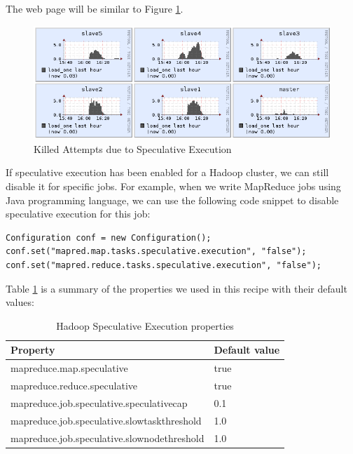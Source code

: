 The web page will be similar to Figure \ref{fig:killed.jobs.speculative}.
\begin{figure}[ht]
  \centering
  \includegraphics[width=.8\textwidth]{figs/5163os_06_10.png}
  \caption{Killed Attempts due to Speculative Execution}\label{fig:killed.jobs.speculative}
\end{figure} 
If speculative execution has been enabled for a Hadoop cluster, we can still disable it for specific jobs. For example, when we write MapReduce jobs using Java programming language, we can use the following code snippet to disable speculative execution for this job:
\lstset{style=bashstyle}
\begin{lstlisting}
Configuration conf = new Configuration();
conf.set("mapred.map.tasks.speculative.execution", "false");
conf.set("mapred.reduce.tasks.speculative.execution", "false");
\end{lstlisting}

Table \ref{tbl:speculative} is a summary of the properties we used in this recipe with their default values:
\begin{table}[ht]
  \centering
  \begin{tabular}{ll}
    \toprule
    \textbf{Property} & \textbf{Default value} \\ \midrule
      mapreduce.map.speculative & true \\
      mapreduce.reduce.speculative & true \\
      mapreduce.job.speculative.speculativecap & 0.1 \\
      mapreduce.job.speculative.slowtaskthreshold & 1.0 \\
      mapreduce.job.speculative.slownodethreshold & 1.0 \\ \bottomrule
  \end{tabular}
  \caption{Hadoop Speculative Execution properties}\label{tbl:speculative}
\end{table}

